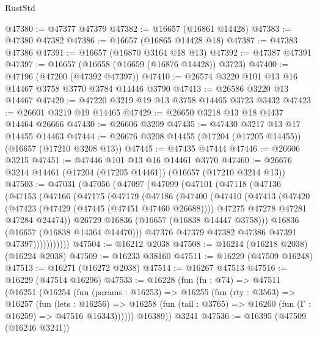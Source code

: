 \begin{lexlean}{RustStd}
\begin{coremodule}
@47380 := @47377 @47379
@47382 := @16657 (@16861 @14428)
@47383 := @47380 @47382
@47386 := @16657 (@16865 @14428 @18)
@47387 := @47383 @47386
@47391 := @16657 (@16870 @3164 @18 @13)
@47392 := @47387 @47391
@47397 := @16657 (@16658 (@16659 (@16876 @14428)) @3723)
@47400 := @47196 (@47200 (@47392 @47397))
@47410 := @26574 @3220 @101 @13 @16 @14467 @3758 @3770 @3784 @14446 @3790
@47413 := @26586 @3220 @13 @14467
@47420 := @47220 @3219 @19 @13 @3758 @14465 @3723 @3432
@47423 := @26601 @3219 @19 @14465
@47429 := @26650 @3218 @13 @18 @4437 @14464 @26666
@47430 := @26606 @3209
@47435 := @47430 @3217 @13 @17 @14455 @14463
@47444 := @26676 @3208 @14455 (@17204 (@17205 @14455)) (@16657 (@17210 @3208 @13))
@47445 := @47435 @47444
@47446 := @26606 @3215
@47451 := @47446 @101 @13 @16 @14461 @3770
@47460 := @26676 @3214 @14461 (@17204 (@17205 @14461)) (@16657 (@17210 @3214 @13))
@47503 := @47031
    (@47056
      (@47097
        (@47099
          (@47101
            (@47118
              (@47136
                (@47153
                  (@47166
                    (@47175
                      (@47179
                        (@47186
                          (@47400
                            (@47410
                              (@47413
                                (@47420
                                  (@47423 (@47429 (@47445 (@47451 @47460 @26688))))
                                  @47275
                                  @47278
                                  @47281
                                  @47284
                                  @24474))
                              @26729
                              @16836
                              (@16657 (@16838 @14447 @3758)))
                            @16836
                            (@16657 (@16838 @14364 @14470)))
                          @47376
                          @47379
                          @47382
                          @47386
                          @47391
                          @47397)))))))))))
@47504 := @16212 @2038
@47508 := @16214 (@16218 @2038) (@16224 @2038)
@47509 := @16233 @38160
@47511 := @16229 (@47509 @16248)
@47513 := @16271 (@16272 @2038)
@47514 := @16267 @47513
@47516 := @16229 (@47514 @16296)
@47533 := @16228
    (fun (fn : @74) =>
    @47511
      (@16251
        (@16254
          (fun (params : @16253) =>
          @16255
            (fun (rty : @3563) =>
            @16257
              (fun (lets : @16256) =>
              @16258 (fun (tail : @3765) => @16260 (fun (Γ : @16259) => @47516 @16343))))))
        @16389))
    @3241
@47536 := @16395 (@47509 (@16246 @3241))

\end{coremodule}
\end{lexlean}
